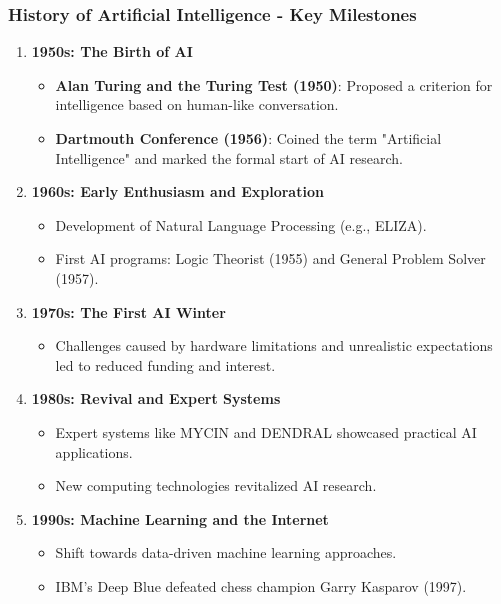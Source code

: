 \documentclass[aspectratio=169]{beamer}
\begin{document}
\begin{frame}[fragile]
    \frametitle{History of Artificial Intelligence - Key Milestones}
    \begin{enumerate}
        \item \textbf{1950s: The Birth of AI}
            \begin{itemize}
                \item \textbf{Alan Turing and the Turing Test (1950)}: Proposed a criterion for intelligence based on human-like conversation.
                \item \textbf{Dartmouth Conference (1956)}: Coined the term "Artificial Intelligence" and marked the formal start of AI research.
            \end{itemize}
        
        \item \textbf{1960s: Early Enthusiasm and Exploration}
            \begin{itemize}
                \item Development of Natural Language Processing (e.g., ELIZA).
                \item First AI programs: Logic Theorist (1955) and General Problem Solver (1957).
            \end{itemize}
        
        \item \textbf{1970s: The First AI Winter}
            \begin{itemize}
                \item Challenges caused by hardware limitations and unrealistic expectations led to reduced funding and interest.
            \end{itemize}
        
        \item \textbf{1980s: Revival and Expert Systems}
            \begin{itemize}
                \item Expert systems like MYCIN and DENDRAL showcased practical AI applications.
                \item New computing technologies revitalized AI research.
            \end{itemize}
        
        \item \textbf{1990s: Machine Learning and the Internet}
            \begin{itemize}
                \item Shift towards data-driven machine learning approaches.
                \item IBM’s Deep Blue defeated chess champion Garry Kasparov (1997).
            \end{itemize}
        

\end{enumerate}
\end{frame}
\end{document}

